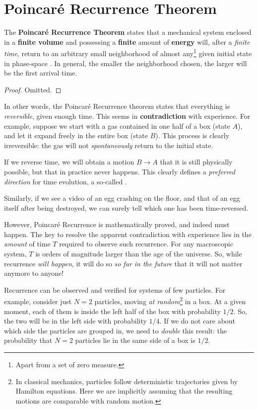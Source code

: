 \documentclass[../../main.tex]{subfiles}
\begin{document}
\section{Poincaré Recurrence Theorem}
The \textbf{Poincaré Recurrence Theorem} states that a mechanical system enclosed in a \textbf{finite volume} and possessing a \textbf{finite} amount of \textbf{energy} will, after a \textit{finite time}, return to an arbitrary small neighborhood of almost any\footnote{Apart from a set of zero measure.} given initial state in phase-space \cite[Chapter~1.7]{mathsm}. In general, the smaller the neighborhood chosen, the larger will be the first arrival time.

\begin{proof}
    Omitted.
\end{proof}

In other words, the Poincaré Recurrence theorem states that everything is \textit{reversible}, given enough time.  
This seems in \textbf{contradiction}  with experience. For example, suppose we start with a gas contained in one half of a box (state $A$), and let it expand freely in the entire box (state $B$). This process is clearly irreversible: the gas will not \textit{spontaneously} return to the initial state. 

If we reverse time, we will obtain a motion $B \to A$ that it is still physically possible, but that in practice never happens. This clearly defines a \textit{preferred direction} for time evolution, a so-called . 

Similarly, if we see a video of an egg crashing on the floor, and that of an egg  itself after being destroyed, we can surely tell which one has been time-reversed. 

\medskip

However, Poincaré Recurrence is mathematically proved, and indeed must happen. The key to resolve the apparent contradiction with experience lies in the \textit{amount} of time $T$ required to observe such recurrence. For any macroscopic system, $T$ is orders of magnitude larger than the age of the universe. So, while recurrence \textit{will happen}, it will do so \textit{so far in the future} that it will not matter anymore to anyone!

\medskip

Recurrence can be observed and verified for systems of few particles. For example, consider just $N=2$ particles, moving \textit{at random}\footnote{In classical mechanics, particles follow deterministic trajectories given by Hamilton equations. Here we are implicitly assuming that the resulting motions are comparable with random motion.} in a box. At a given moment, each of them is inside the left half of the box with probability $1/2$. So, the two will be in the left side with probability $1/4$. If we do not care about which side the particles are grouped in, we need to \textit{double} this result: the probability that $N=2$ particles lie in the same side of a box is $1/2$.
\end{document}
